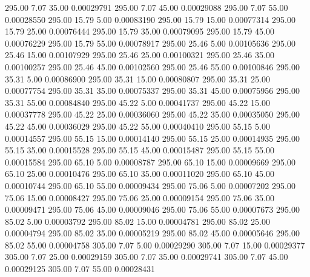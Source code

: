     295.00      7.07     35.00     0.00029791
    295.00      7.07     45.00     0.00029088
    295.00      7.07     55.00     0.00028550
    295.00     15.79      5.00     0.00083190
    295.00     15.79     15.00     0.00077314
    295.00     15.79     25.00     0.00076444
    295.00     15.79     35.00     0.00079095
    295.00     15.79     45.00     0.00076229
    295.00     15.79     55.00     0.00078917
    295.00     25.46      5.00     0.00105636
    295.00     25.46     15.00     0.00107929
    295.00     25.46     25.00     0.00100321
    295.00     25.46     35.00     0.00100257
    295.00     25.46     45.00     0.00102560
    295.00     25.46     55.00     0.00100846
    295.00     35.31      5.00     0.00086900
    295.00     35.31     15.00     0.00080807
    295.00     35.31     25.00     0.00077754
    295.00     35.31     35.00     0.00075337
    295.00     35.31     45.00     0.00075956
    295.00     35.31     55.00     0.00084840
    295.00     45.22      5.00     0.00041737
    295.00     45.22     15.00     0.00037778
    295.00     45.22     25.00     0.00036060
    295.00     45.22     35.00     0.00035050
    295.00     45.22     45.00     0.00036029
    295.00     45.22     55.00     0.00040410
    295.00     55.15      5.00     0.00014557
    295.00     55.15     15.00     0.00014140
    295.00     55.15     25.00     0.00014935
    295.00     55.15     35.00     0.00015528
    295.00     55.15     45.00     0.00015487
    295.00     55.15     55.00     0.00015584
    295.00     65.10      5.00     0.00008787
    295.00     65.10     15.00     0.00009669
    295.00     65.10     25.00     0.00010476
    295.00     65.10     35.00     0.00011020
    295.00     65.10     45.00     0.00010744
    295.00     65.10     55.00     0.00009434
    295.00     75.06      5.00     0.00007202
    295.00     75.06     15.00     0.00008427
    295.00     75.06     25.00     0.00009154
    295.00     75.06     35.00     0.00009471
    295.00     75.06     45.00     0.00009046
    295.00     75.06     55.00     0.00007673
    295.00     85.02      5.00     0.00003792
    295.00     85.02     15.00     0.00004781
    295.00     85.02     25.00     0.00004794
    295.00     85.02     35.00     0.00005219
    295.00     85.02     45.00     0.00005646
    295.00     85.02     55.00     0.00004758
    305.00      7.07      5.00     0.00029290
    305.00      7.07     15.00     0.00029377
    305.00      7.07     25.00     0.00029159
    305.00      7.07     35.00     0.00029741
    305.00      7.07     45.00     0.00029125
    305.00      7.07     55.00     0.00028431
